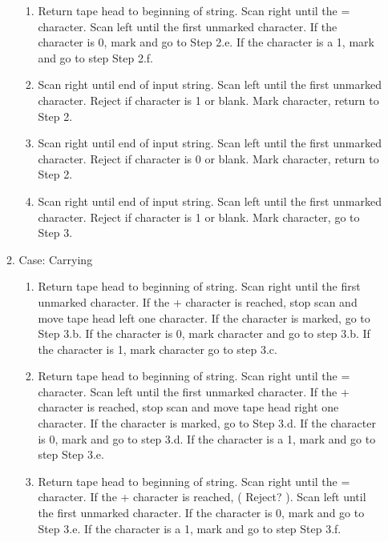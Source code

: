 ﻿\documentclass{article}
\begin{document}
\begin{enumerate}[a)]
\begin{enumerate}[1)]
\begin{enumerate}[(2.a)]
    \item Return tape head to beginning of string. Scan right until the = character. Scan left until the first unmarked character. If the character is 0, mark and go to Step 2.e.  If the character is a 1, mark and go to step Step 2.f.
    
    \item Scan right until end of input string. Scan left until the first unmarked character. Reject if character is 1 or blank. Mark character, return to Step 2.
    
    \item Scan right until end of input string. Scan left until the first unmarked character. Reject if character is 0 or blank. Mark character, return to Step 2.
    
    \item Scan right until end of input string. Scan left until the first unmarked character. Reject if character is 1 or blank. Mark character, go to Step 3.
    

    \end{enumerate}
    
    
\item Case: Carrying

    \begin{enumerate}[(3.a)]
    
    \item Return tape head to beginning of string. Scan right until the first unmarked character. If the + character is reached, stop scan and move tape head left one character. If the character is marked, go to Step 3.b. If the character is 0, mark character and go to step 3.b. If the character is 1, mark character go to step 3.c.
    
    \item Return tape head to beginning of string. Scan right until the = character. Scan left until the first unmarked character. If the + character is reached, stop scan and move tape head right one character. If the character is marked, go to Step 3.d. If the character is 0, mark and go to step 3.d.  If the character is a 1, mark and go to step Step 3.e.
    
    \item Return tape head to beginning of string. Scan right until the = character. If the + character is reached, ( Reject? ).  Scan left until the first unmarked character. If the character is 0, mark and go to Step 3.e.  If the character is a 1, mark and go to step Step 3.f.
    

\end{enumerate}
\end{enumerate}
\end{enumerate}
\end{document}
